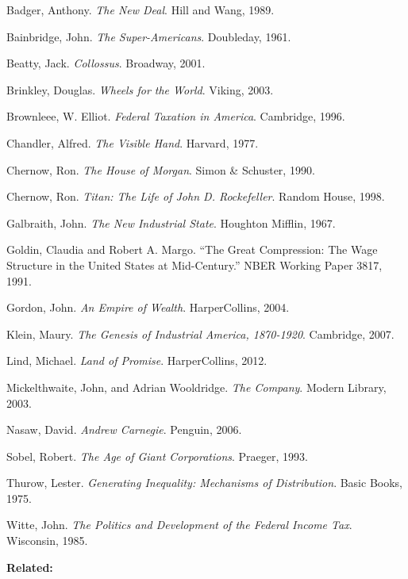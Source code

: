 Badger, Anthony. \emph{The New Deal}. Hill and Wang, 1989.

Bainbridge, John. \emph{The Super-Americans}. Doubleday, 1961.

Beatty, Jack. \emph{Collossus}. Broadway, 2001.

Brinkley, Douglas. \emph{Wheels for the World}. Viking, 2003.

Brownleee, W. Elliot. \emph{Federal Taxation in America}. Cambridge,
1996.

Chandler, Alfred. \emph{The Visible Hand}. Harvard, 1977.

Chernow, Ron. \emph{The House of Morgan}. Simon \& Schuster, 1990.

Chernow, Ron. \emph{Titan: The Life of John D. Rockefeller}. Random
House, 1998.

Galbraith, John. \emph{The New Industrial State}. Houghton Mifflin,
1967.

Goldin, Claudia and Robert A. Margo. ``The Great Compression: The Wage
Structure in the United States at Mid-Century.'' NBER Working Paper
3817, 1991.

Gordon, John. \emph{An Empire of Wealth}. HarperCollins, 2004.

Klein, Maury. \emph{The Genesis of Industrial America, 1870-1920}.
Cambridge, 2007.

Lind, Michael. \emph{Land of Promise}. HarperCollins, 2012.

Mickelthwaite, John, and Adrian Wooldridge. \emph{The Company}. Modern
Library, 2003.

Nasaw, David. \emph{Andrew Carnegie}. Penguin, 2006.

Sobel, Robert. \emph{The Age of Giant Corporations}. Praeger, 1993.

Thurow, Lester. \emph{Generating Inequality: Mechanisms of
Distribution}. Basic Books, 1975.

Witte, John. \emph{The Politics and Development of the Federal Income
Tax}. Wisconsin, 1985.

\textbf{Related:}